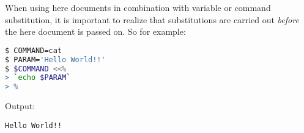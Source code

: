 When using here documents in combination with variable or command substitution,
it is important to realize that substitutions are carried out \emph{before} the
here document is passed on. So for example:
\lstset{basicstyle=\scriptsize, numbers=left, captionpos=b, tabsize=4}
\begin{lstlisting}[caption=Using a here document with substitutions,language={bash},
breaklines=true,xleftmargin=15pt,label=lst:Using a here document with substitutions]
$ COMMAND=cat
$ PARAM='Hello World!!'
$ $COMMAND <<%
> `echo $PARAM`
> %
\end{lstlisting}

Output:
\scriptsize
\begin{verbatim}
Hello World!!
\end{verbatim}
\normalsize
